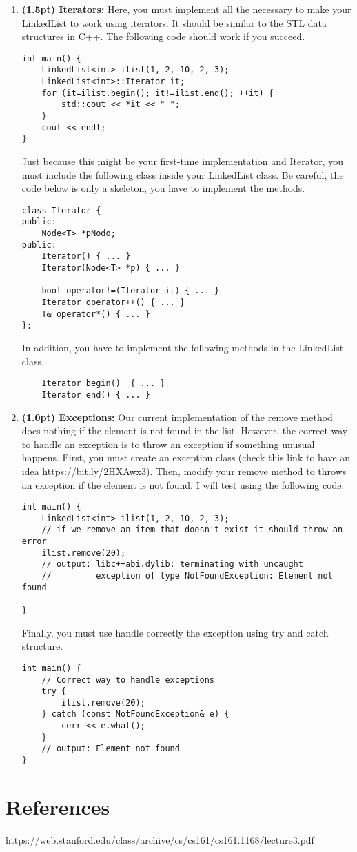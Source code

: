 \documentclass{article}
\begin{document}
\begin{enumerate}[label=\Alph*]
  \item \textbf{(1.5pt) Iterators:} Here, you must implement all the necessary to make your LinkedList to work using iterators. It should be similar to the STL data structures in C++. The following code should work if you succeed.
  
\begin{lstlisting}
int main() {
    LinkedList<int> ilist(1, 2, 10, 2, 3);
    LinkedList<int>::Iterator it;
    for (it=ilist.begin(); it!=ilist.end(); ++it) {
        std::cout << *it << " ";
    }
    cout << endl;
}
\end{lstlisting}

Just because this might be your first-time implementation and Iterator, you must include the following class inside your LinkedList class. Be careful, the code below is only a skeleton, you have to implement the methods. 

\begin{lstlisting}
class Iterator {
public:
    Node<T> *pNodo;
public:
    Iterator() { ... }
    Iterator(Node<T> *p) { ... }

    bool operator!=(Iterator it) { ... }
    Iterator operator++() { ... }
    T& operator*() { ... }
};
\end{lstlisting}

In addition, you have to implement the following methods in the LinkedList class. 

\begin{lstlisting}
    Iterator begin()  { ... }
    Iterator end() { ... }
\end{lstlisting}
  
  \item \textbf{(1.0pt) Exceptions:} Our current implementation of the remove method does nothing if the element is not found in the list. However, the correct way to handle an exception is to throw an exception if something unusual happens. First, you must create an exception class (check this link to have an idea \url{https://bit.ly/2HXAwx3}). Then, modify your remove method to throws an exception if the element is not found. I will test using the following code: 

\begin{lstlisting}
int main() {
    LinkedList<int> ilist(1, 2, 10, 2, 3);
    // if we remove an item that doesn't exist it should throw an error
    ilist.remove(20);
    // output: libc++abi.dylib: terminating with uncaught
    //         exception of type NotFoundException: Element not found

}
\end{lstlisting}

Finally, you must use handle correctly the exception using try and catch structure.
  
\begin{lstlisting}
int main() {
    // Correct way to handle exceptions
    try {
        ilist.remove(20);
    } catch (const NotFoundException& e) {
        cerr << e.what();
    }
    // output: Element not found
}
\end{lstlisting}
  
\end{enumerate}

\section{References}

https://web.stanford.edu/class/archive/cs/cs161/cs161.1168/lecture3.pdf
\end{document}
